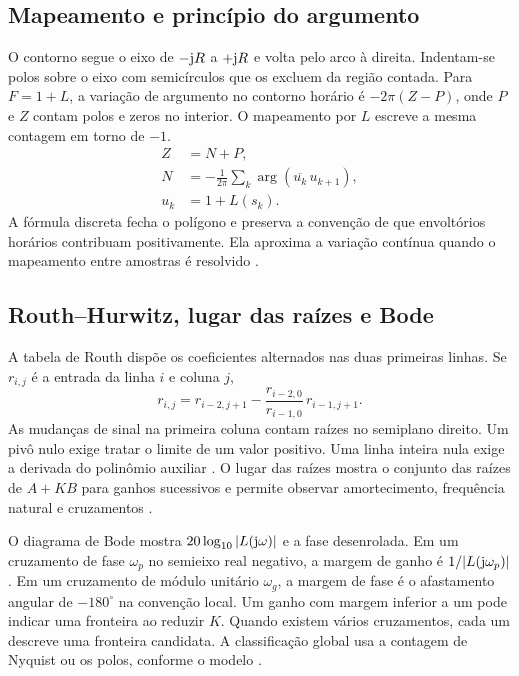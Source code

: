 \subsection{Mapeamento e princípio do argumento}
O contorno segue o eixo de $-\mathrm{j} R$ a $+\mathrm{j} R$ e volta pelo arco à direita.
Indentam-se polos sobre o eixo com semicírculos que os excluem da
região contada. Para $F=1+L$, a variação de argumento no contorno
horário é $-2\pi(Z-P)$, onde $P$ e $Z$ contam polos e zeros no interior.
O mapeamento por $L$ escreve a mesma contagem em torno de $-1$.
\begin{equation}
\begin{aligned}
Z &= N+P,\\
N &= -\frac{1}{2\pi}\sum_{k}\arg
 \left(\overline{u_k}\,u_{k+1}\right),\\
u_k &= 1+L(s_k).
\end{aligned}
\label{eq:nyquist}
\end{equation}
A fórmula discreta fecha o polígono e preserva a convenção de que
envoltórios horários contribuam positivamente. Ela aproxima a
variação contínua quando o mapeamento entre amostras é resolvido
\cite{astrom2008}.

\subsection{Routh--Hurwitz, lugar das raízes e Bode}
A tabela de Routh dispõe os coeficientes alternados nas duas primeiras
linhas. Se $r_{i,j}$ é a entrada da linha $i$ e coluna $j$,
\[
r_{i,j}=r_{i-2,j+1}
-\frac{r_{i-2,0}}{r_{i-1,0}}\,r_{i-1,j+1}.
\]
As mudanças de sinal na primeira coluna contam raízes no semiplano
direito. Um pivô nulo exige tratar o limite de um valor positivo.
Uma linha inteira nula exige a derivada do polinômio auxiliar
\cite{routh1877,nise2017}. O lugar das raízes mostra o conjunto das
raízes de $A+KB$ para ganhos sucessivos e permite observar
amortecimento, frequência natural e cruzamentos \cite{evans1950}.

O diagrama de Bode mostra $20\log_{10}|L(\mathrm{j}\omega)|$ e a fase
desenrolada. Em um cruzamento de fase $\omega_p$ no semieixo real
negativo, a margem de ganho é $1/|L(\mathrm{j}\omega_p)|$. Em um cruzamento
de módulo unitário $\omega_g$, a margem de fase é o afastamento
angular de $-180^{\circ}$ na convenção local. Um ganho com margem
inferior a um pode indicar uma fronteira ao reduzir $K$. Quando
existem vários cruzamentos, cada um descreve uma fronteira candidata.
A classificação global usa a contagem de Nyquist ou os polos, conforme
o modelo \cite{bode1945,astrom2008}.

